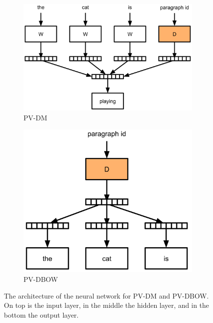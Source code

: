 \begin{figure}
	\centering
	\begin{subfigure}{.575\textwidth}
		\centering
		\includegraphics[width=1.0\linewidth]{3preliminaries/pv-dm}
		\caption{PV-DM}
		\label{fig:3:pv-dm}
	\end{subfigure}\begin{subfigure}{.425\textwidth}
	\centering
	\includegraphics[width=1.0\linewidth]{3preliminaries/pv-dbow}
	\caption{PV-DBOW}
	\label{fig:3:pv-dbow}
	\end{subfigure}
\caption{The architecture of the neural network for PV-DM and PV-DBOW\@. On top is the input layer, in the middle the hidden layer, and in the bottom the output layer.}
\label{fig:3:pv-dbow-pv-dm}
\end{figure}
